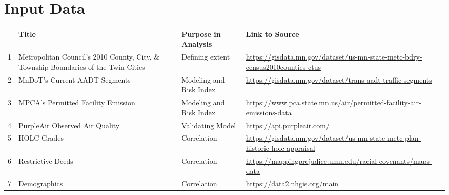 \documentclass[article,12pt]{article}
\numberwithin{equation}{section}
\begin{document}
\section*{Input Data}
{
	\scriptsize
	\begin{tabular}{|l|p{.2\linewidth}|p{.2\linewidth}|p{.4\linewidth}|}
	& \textbf{Title}                              & \textbf{Purpose in Analysis}     & \textbf{Link to Source}    
	\\
	1 & Metropolitan Council's 2010 County, City, \& Township Boundaries of the Twin Cities \cite{metrocouncil2010}     & Defining extent & \url{https://gisdata.mn.gov/dataset/us-mn-state-metc-bdry-census2010counties-ctus}                                                                 \\
	2 & MnDoT’s Current AADT Segments \cite{mndot_reg}     & Modeling and Risk Index & \url{https://gisdata.mn.gov/dataset/trans-aadt-traffic-segments}                   \\
	3 & MPCA’s Permitted Facility Emission \cite{mpca_emitter} & Modeling and Risk Index & \url{https://www.pca.state.mn.us/air/permitted-facility-air-emissions-data}        \\
	4 & PurpleAir Observed Air Quality    & Validating Model        & \url{https://api.purpleair.com/}                                                   \\
	5 & HOLC Grades                        & Correlation             & \url{https://gisdata.mn.gov/dataset/us-mn-state-metc-plan-historic-holc-appraisal} \\
	6 & Restrictive Deeds                  & Correlation             & \url{https://mappingprejudice.umn.edu/racial-covenants/maps-data}                \\
	7 & Demographics \cite{ipums}                       & Correlation             & \url{https://data2.nhgis.org/main}                                               
\end{tabular}
}
\end{document}
